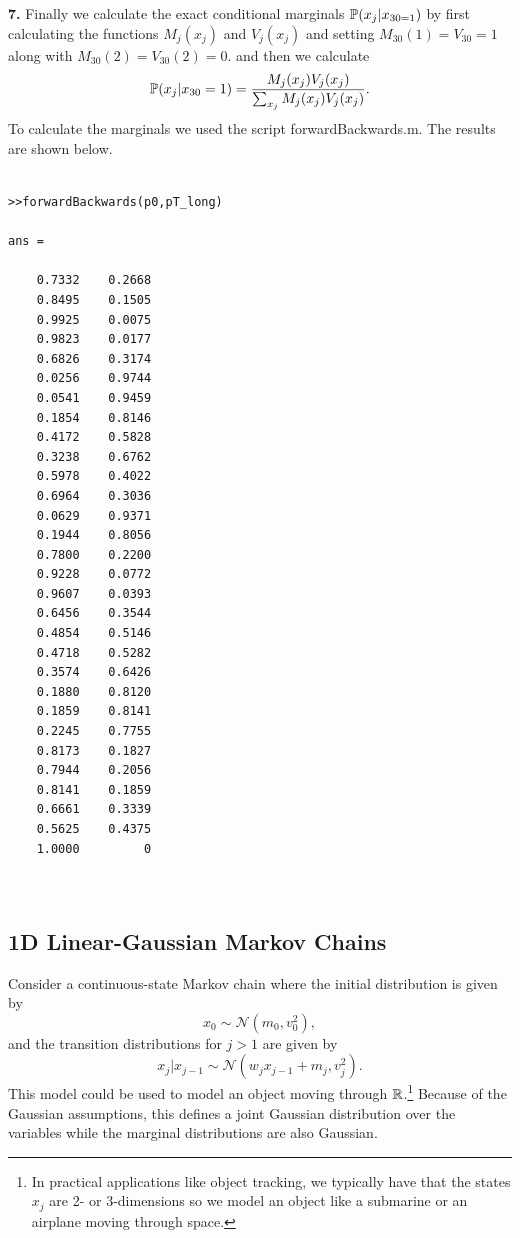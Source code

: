 \documentclass{article}
\begin{document}
\textbf{7.}
\newline
Finally we calculate the exact conditional marginals $\mathbb{P}(x_{j}|x_{30=1})$ by first calculating the functions $M_{j}(x_{j})$ and $V_{j}(x_{j})$
and setting $M_{30}(1)=V_{30}=1$ along with $M_{30}(2)=V_{30}(2)=0$. and then we calculate
\begin{equation*}
\mathbb{P}(x_{j}|x_{30}=1)=\frac{M_{j}(x_{j})V_{j}(x_{j})}{\sum_{x_{j}}M_{j}(x_{j})V_{j}(x_{j})}.
\end{equation*}
To calculate the marginals we used the script forwardBackwards.m. The results are shown below.

\begin{verbatim}

>>forwardBackwards(p0,pT_long)

ans =

    0.7332    0.2668
    0.8495    0.1505
    0.9925    0.0075
    0.9823    0.0177
    0.6826    0.3174
    0.0256    0.9744
    0.0541    0.9459
    0.1854    0.8146
    0.4172    0.5828
    0.3238    0.6762
    0.5978    0.4022
    0.6964    0.3036
    0.0629    0.9371
    0.1944    0.8056
    0.7800    0.2200
    0.9228    0.0772
    0.9607    0.0393
    0.6456    0.3544
    0.4854    0.5146
    0.4718    0.5282
    0.3574    0.6426
    0.1880    0.8120
    0.1859    0.8141
    0.2245    0.7755
    0.8173    0.1827
    0.7944    0.2056
    0.8141    0.1859
    0.6661    0.3339
    0.5625    0.4375
    1.0000         0



\end{verbatim}





\subsection{1D Linear-Gaussian Markov Chains}

Consider a continuous-state Markov chain where the initial distribution is given by
\[
x_0 \sim \mathcal{N}(m_0, v_0^2),
\]
and the transition distributions for $j > 1$ are given by
\[
x_j | x_{j-1} \sim \mathcal{N}(w_jx_{j-1} + m_j, v_j^2).
\]
This model could be used to model an object moving through $\mathbb{R}$.\footnote{In practical applications like object tracking, we typically have that the states $x_j$ are 2- or 3-dimensions so we model an object like a submarine or an airplane moving through space.} Because of the Gaussian assumptions, this defines a joint Gaussian distribution over the variables while the marginal distributions are also Gaussian. 
\end{document}
